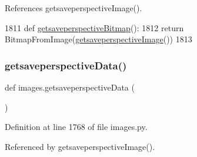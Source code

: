 References getsaveperspective\+Image().


\begin{DoxyCode}
1811 \textcolor{keyword}{def }\hyperlink{namespaceimages_a1837442bb3b6afc1d9c2bf47de0212d6}{getsaveperspectiveBitmap}():
1812     \textcolor{keywordflow}{return} BitmapFromImage(\hyperlink{namespaceimages_a59a28f3572347d6753c73514a00bb81e}{getsaveperspectiveImage}())
1813 
\end{DoxyCode}
\mbox{\label{namespaceimages_a5c65b00e1312b2ea05eefb933a4b0b05}} 
\subsubsection{\texorpdfstring{getsaveperspective\+Data()}{getsaveperspectiveData()}}
{\footnotesize\ttfamily def images.\+getsaveperspective\+Data (\begin{DoxyParamCaption}{ }\end{DoxyParamCaption})}



Definition at line 1768 of file images.\+py.



Referenced by getsaveperspective\+Image().



